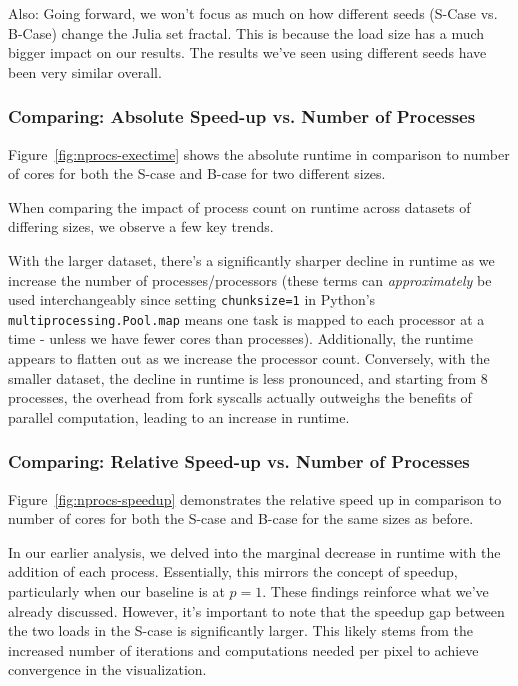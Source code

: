 \documentclass[a4paper,%
11pt,%
DIV12,
headsepline,%
headings=normal,
]{scrartcl}
\begin{document}
Also: Going forward, we won't focus as much on how different seeds (S-Case vs. B-Case) change the Julia set fractal. This is because the load size has a much bigger impact on our results.  The results we've seen using different seeds have been very similar overall.

\subsubsection{Comparing: Absolute Speed-up vs. Number of Processes}

Figure~\ref{fig:nprocs-exectime} shows the absolute runtime in comparison to number of cores for both the S-case and B-case for two different sizes.

When comparing the impact of process count on runtime across datasets of differing sizes, we observe a few key trends.

With the larger dataset, there's a significantly sharper decline in runtime as we increase the number of processes/processors (these terms can \textit{approximately} be used interchangeably since setting \verb|chunksize=1| in Python's \verb|multiprocessing.Pool.map| means one task is mapped to each processor at a time - unless we have fewer cores than processes). Additionally, the runtime appears to flatten out as we increase the processor count. Conversely, with the smaller dataset, the decline in runtime is less pronounced, and starting from 8 processes, the overhead from fork syscalls actually outweighs the benefits of parallel computation, leading to an increase in runtime.

\subsubsection{Comparing: Relative Speed-up vs. Number of Processes}

Figure~\ref{fig:nprocs-speedup} demonstrates the relative speed up in comparison to number of cores for both the S-case and B-case for the same sizes as before.  

In our earlier analysis, we delved into the marginal decrease in runtime with the addition of each process. Essentially, this mirrors the concept of speedup, particularly when our baseline is at $p=1$. These findings reinforce what we've already discussed. However, it's important to note that the speedup gap between the two loads in the S-case is significantly larger. This likely stems from the increased number of iterations and computations needed per pixel to achieve convergence in the visualization.
\end{document}
